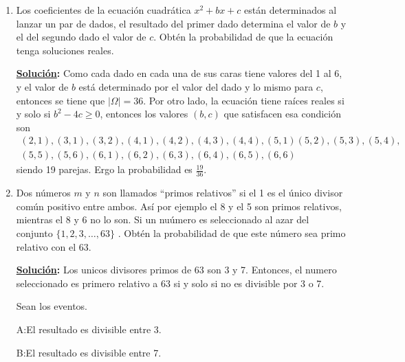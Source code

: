 \documentclass[11pt,letterpaper]{report}
\newcommand{\sol}{\textbf{\underline{Solución}: }} %
\begin{document}
\begin{enumerate}
\begin{itemize}
    \sol $\binom{13}{2}\binom{4}{2}\binom{4}{2}\binom{44}{1}/\binom{52}{5}$
    
    \item una Tercia?

    \sol $13\binom{4}{3}\binom{12}{2}\binom{4}{1}\binom{4}{1}/\binom{52}{5}$

    \item un Poker? \textbf{Tenemos un Poker cuando la mano que nos tocaron contiene 4 cartas con
    la misma denominación y de diferente palo}

    \sol $13\binom{4}{4}\binom{48}{1}/\binom{52}{5}$
    
\end{itemize}

\item Los coeficientes de la ecuación cuadrática $x^2 + bx + c$ están determinados al lanzar un par
de dados, el resultado del primer dado determina el valor de $b$ y el del segundo dado el valor de
$c$. Obtén la probabilidad de que la ecuación tenga soluciones reales.

\sol Como cada dado en cada una de sus caras tiene valores del 1 al 6, y el valor de $b$ está
determinado por el valor del dado y lo mismo para $c$, entonces se tiene que $|\Omega|=36$.
Por otro lado, la ecuación tiene raíces reales si y solo si $b^2 - 4c \geq 0$, entonces los valores
$(b,c)$ que satisfacen esa condición son 
\begin{multline*}
    (2,1),(3,1),(3,2),(4,1),(4,2),(4,3),(4,4),(5,1)(5,2),(5,3),(5,4),\\
    (5,5),(5,6),(6,1),(6,2),(6,3),(6,4),(6,5),(6,6)
\end{multline*}
siendo 19 parejas. Ergo la probabilidad es $\frac{19}{36}$.

\item Dos números $m$ y $n$ son llamados ``primos relativos'' si el 1 es el único divisor común
positivo entre ambos. Así por ejemplo el 8 y el 5 son primos relativos, mientras el 8 y 6 no lo son.
Si un nuúmero es seleccionado al azar del conjunto $\{ 1, 2, 3,\ldots, 63 \}$ . Obtén la
probabilidad de que este número sea primo relativo con el 63.

\sol Los unicos divisores primos de 63 son 3 y 7. Entonces, el numero seleccionado es primero relativo a 63 si y solo si no es divisible por 3 o 7.

Sean los eventos.

A:El resultado es divisible entre 3.

B:El resultado es divisible entre 7.


\end{enumerate}
\end{document}

